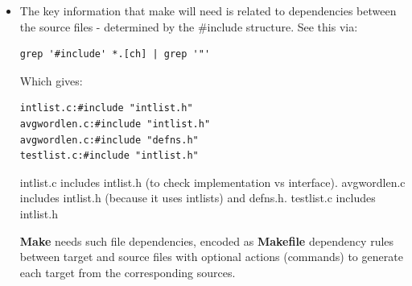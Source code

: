 \documentclass[handout]{beamer}
\begin{document}
\begin{frame}[fragile]

    \begin{itemize}
    \item
    The key information that \alert{make} will need is related
    to \alert{dependencies} between the source files - determined by the \alert{\#include} structure.
    \pause
    See this via:
\begin{verbatim}
grep '#include' *.[ch] | grep '"'
\end{verbatim}

    \pitem
    Which gives:
{\small
\begin{verbatim}
intlist.c:#include "intlist.h"
avgwordlen.c:#include "intlist.h"
avgwordlen.c:#include "defns.h"
testlist.c:#include "intlist.h"
\end{verbatim}
}

    \pitem \alert{intlist.c} includes \alert{intlist.h}
            (to check implementation vs interface).
    \pitem \alert{avgwordlen.c} includes \alert{intlist.h} (because it uses intlists) and \alert{defns.h}.
    \pitem \alert{testlist.c} includes \alert{intlist.h}

    \pitem
    {\bf Make} needs such file dependencies,
    encoded as {\bf Makefile} dependency rules between
%
    \alert{target} and \alert{source} files with
    \alert{optional actions} (commands) to generate each
    target from the corresponding sources.
    \end{itemize}

\end{frame}
\end{document}
